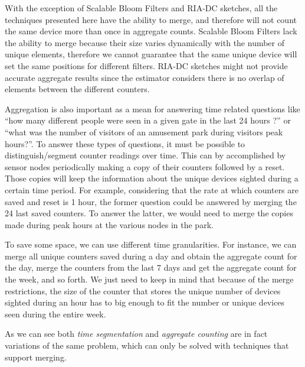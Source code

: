 With the exception of Scalable Bloom Filters and RIA-DC sketches, all
the techniques presented here have the ability to merge, and therefore
will not count the same device more than once in aggregate
counts. Scalable Bloom Filters lack the ability to merge because their
size varies dynamically with the number of unique elements, therefore
we cannot guarantee that the same unique device will set the same
positions for different filters. RIA-DC sketches might not provide
accurate aggregate results since the estimator considers there is no
overlap of elements between the different counters.

Aggregation is also important as a mean for answering time related
questions like ``how many different people were seen in a given gate
in the last 24 hours ?'' or ``what was the number of visitors of an
amusement park during visitors peak hours?''. To answer these types of
questions, it must be possible to distinguish/segment counter readings
over time. This can by accomplished by sensor nodes periodically
making a copy of their counters followed by a reset. Those copies will
keep the information about the unique devices sighted during a certain
time period. For example, considering that the rate at which counters
are saved and reset is 1 hour, the former question could be answered
by merging the 24 last saved counters. To answer the latter, we would
need to merge the copies made during peak hours at the various nodes
in the park.

To save some space, we can use different time granularities. For
instance, we can merge all unique counters saved during a day and
obtain the aggregate count for the day, merge the counters from the
last 7 days and get the aggregate count for the week, and so forth. We
just need to keep in mind that because of the merge restrictions, the
size of the counter that stores the unique number of devices sighted
during an hour has to big enough to fit the number or unique devices
seen during the entire week.

As we can see both \emph{time segmentation} and \emph{aggregate counting}
are in fact variations of the same problem, which can only be solved with
techniques that support merging.

